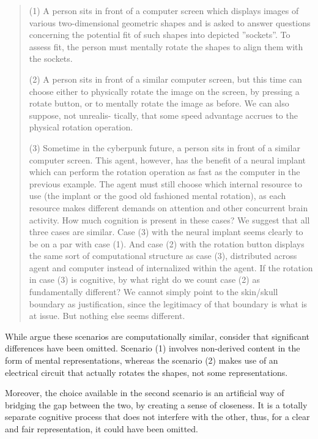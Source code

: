 \documentclass[12pt]{article}
\begin{document}
\begin{quotation}
    (1) A person sits in front of a computer screen which displays images of various
    two-dimensional geometric shapes and is asked to answer questions concerning the 
    potential fit of such shapes into depicted ''sockets''. To assess fit, the
    person must mentally rotate the shapes to align them with the sockets.


    (2) A person sits in front of a similar computer screen, but this time can choose
    either to physically rotate the image on the screen, by pressing a rotate button,
    or to mentally rotate the image as before. We can also suppose, not unrealis-
    tically, that some speed advantage accrues to the physical rotation operation.


    (3) Sometime in the cyberpunk future, a person sits in front of a similar computer
    screen. This agent, however, has the benefit of a neural implant which can
    perform the rotation operation as fast as the computer in the previous
    example. The agent must still choose which internal resource to use (the
    implant or the good old fashioned mental rotation), as each resource makes
    different demands on attention and other concurrent brain activity. How
    much cognition is present in these cases? We suggest that all three cases are
    similar. Case (3) with the neural implant seems clearly to be on a par with
    case (1). And case (2) with the rotation button displays the same sort of
    computational structure as case (3), distributed across agent and computer
    instead of internalized within the agent. If the rotation in case (3) is cognitive,
    by what right do we count case (2) as fundamentally different? We cannot
    simply point to the skin/skull boundary as justification, since the legitimacy of
    that boundary is what is at issue. But nothing else seems different. \parencite[p. 1]{clark1998extended}
\end{quotation}

While \textcite{clark1998extended} argue these scenarios are computationally similar,
\textcite{adams2001bounds} consider that significant differences have been omitted. Scenario (1)
involves non-derived content in the form of mental representations, whereas the scenario (2)
makes use of an electrical circuit that actually rotates the shapes, not some
representations.

Moreover, the choice available in the second scenario is an artificial way of 
bridging the gap between the two, by creating a sense of closeness. 
It is a totally separate cognitive process that does not interfere with the other,
thus, for a clear and fair representation, it could have been omitted.
\end{document}
